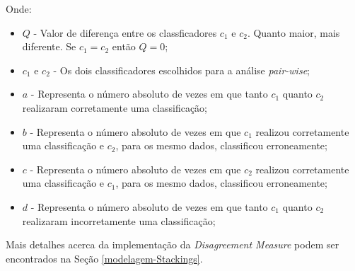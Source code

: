Onde:
\begin{itemize}
    \item $Q$ - Valor de diferença entre os classficadores $c_1$ e $c_2$. Quanto maior, mais diferente. Se $c_1 = c_2$ então $Q = 0$;
    
    \item $c_1$ e $c_2$ - Os dois classificadores escolhidos para a análise \textit{pair-wise};
    
    \item $a$ - Representa o número absoluto de vezes em que tanto $c_1$ quanto $c_2$ realizaram corretamente uma classificação;
    
    \item $b$ - Representa o número absoluto de vezes em que $c_1$ realizou corretamente uma classificação e $c_2$, para os mesmo dados, classificou erroneamente;
    
    \item $c$ - Representa o número absoluto de vezes em que $c_2$ realizou corretamente uma classificação e $c_1$, para os mesmo dados, classificou erroneamente;
    
    \item $d$ - Representa o número absoluto de vezes em que tanto $c_1$ quanto $c_2$ realizaram incorretamente uma classificação;
\end{itemize}

Mais detalhes acerca da implementação da \textit{Disagreement Measure} podem ser encontrados na Seção \ref{modelagem-Stackings}.